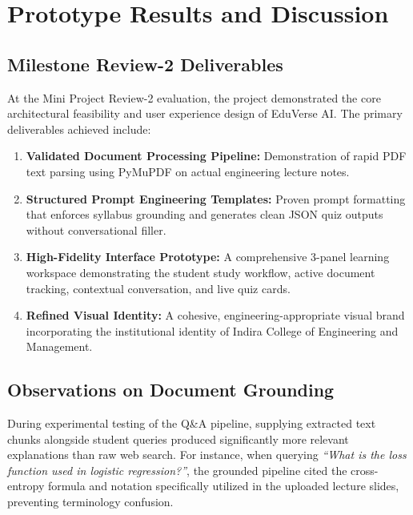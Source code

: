 \documentclass[11pt,a4paper]{report}
\begin{document}
\chapter{Prototype Results and Discussion}
\label{ch:results}

\section{Milestone Review-2 Deliverables}
At the Mini Project Review-2 evaluation, the project demonstrated the core architectural feasibility and user experience design of EduVerse AI. The primary deliverables achieved include:
\begin{enumerate}[noitemsep, topsep=2pt]
    \item \textbf{Validated Document Processing Pipeline:} Demonstration of rapid PDF text parsing using PyMuPDF on actual engineering lecture notes.
    \item \textbf{Structured Prompt Engineering Templates:} Proven prompt formatting that enforces syllabus grounding and generates clean JSON quiz outputs without conversational filler.
    \item \textbf{High-Fidelity Interface Prototype:} A comprehensive 3-panel learning workspace demonstrating the student study workflow, active document tracking, contextual conversation, and live quiz cards.
    \item \textbf{Refined Visual Identity:} A cohesive, engineering-appropriate visual brand incorporating the institutional identity of Indira College of Engineering and Management.
\end{enumerate}

\section{Observations on Document Grounding}
During experimental testing of the Q\&A pipeline, supplying extracted text chunks alongside student queries produced significantly more relevant explanations than raw web search. For instance, when querying \textit{``What is the loss function used in logistic regression?''}, the grounded pipeline cited the cross-entropy formula and notation specifically utilized in the uploaded lecture slides, preventing terminology confusion.
\end{document}
